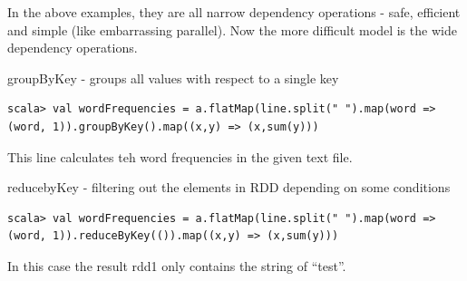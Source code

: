 \documentclass[notheorems, aspectratio=54]{beamer}
\begin{document}

\begin{frame}[fragile]

In the above examples, they are all narrow dependency operations - safe, efficient and simple (like embarrassing parallel). 
Now the more difficult model is the wide dependency operations.

\begin{block}{groupByKey - groups all values with respect to a single key}
\begin{verbatim}
scala> val wordFrequencies = a.flatMap(line.split(" ").map(word => (word, 1)).groupByKey().map((x,y) => (x,sum(y)))
\end{verbatim}
\end{block}
This line calculates teh word frequencies in the given text file.

\begin{block}{reducebyKey - filtering out the elements in RDD depending on some conditions}
\begin{verbatim}
scala> val wordFrequencies = a.flatMap(line.split(" ").map(word => (word, 1)).reduceByKey(()).map((x,y) => (x,sum(y)))
\end{verbatim}
\end{block}
In this case the result rdd1 only contains the string of ``test''.

\end{frame}
\end{document}
